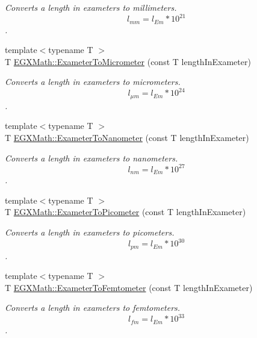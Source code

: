 \begin{DoxyCompactItemize}
\begin{DoxyCompactList}\small\item\em Converts a length in exameters to millimeters. \[ l_{mm}=l_{Em} * 10^{21} \]. \end{DoxyCompactList}\item 
{\footnotesize template$<$typename T $>$ }\\T \mbox{\hyperlink{group___e_g_x_math-_conversions-_length_conversions-_exameter-_s_i_gaee4a8b1fa77d023e7db7180e62646388}{E\+G\+X\+Math\+::\+Exameter\+To\+Micrometer}} (const T length\+In\+Exameter)
\begin{DoxyCompactList}\small\item\em Converts a length in exameters to micrometers. \[ l_{\mu m}=l_{Em} * 10^{24} \]. \end{DoxyCompactList}\item 
{\footnotesize template$<$typename T $>$ }\\T \mbox{\hyperlink{group___e_g_x_math-_conversions-_length_conversions-_exameter-_s_i_ga78c5c3f8008fc44c81b3d89b44d3db19}{E\+G\+X\+Math\+::\+Exameter\+To\+Nanometer}} (const T length\+In\+Exameter)
\begin{DoxyCompactList}\small\item\em Converts a length in exameters to nanometers. \[ l_{nm}=l_{Em} * 10^{27} \]. \end{DoxyCompactList}\item 
{\footnotesize template$<$typename T $>$ }\\T \mbox{\hyperlink{group___e_g_x_math-_conversions-_length_conversions-_exameter-_s_i_gaf524e8324fedf2eb61d43ce1dc36bcac}{E\+G\+X\+Math\+::\+Exameter\+To\+Picometer}} (const T length\+In\+Exameter)
\begin{DoxyCompactList}\small\item\em Converts a length in exameters to picometers. \[ l_{pm}=l_{Em} * 10^{30} \]. \end{DoxyCompactList}\item 
{\footnotesize template$<$typename T $>$ }\\T \mbox{\hyperlink{group___e_g_x_math-_conversions-_length_conversions-_exameter-_s_i_gaaa4f07b6d6b2e4a9e1947d4d9724c110}{E\+G\+X\+Math\+::\+Exameter\+To\+Femtometer}} (const T length\+In\+Exameter)
\begin{DoxyCompactList}\small\item\em Converts a length in exameters to femtometers. \[ l_{fm}=l_{Em} * 10^{33} \]. \end{DoxyCompactList}\item 

\end{DoxyCompactItemize}
